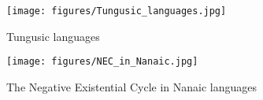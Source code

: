 \documentclass[output=paper]{langscibook}
\begin{document}
\begin{figure}[!h] 
    \captionsetup{name=Map}
    \texttt{[image: figures/Tungusic\_languages.jpg]}
    \caption{Tungusic languages}
    \label{fig:tungusic_languages}
\end{figure}

\pagebreak
\begin{figure}[!h] 
    \captionsetup{name=Map}
    \texttt{[image: figures/NEC\_in\_Nanaic.jpg]}
    \caption{The Negative Existential Cycle in Nanaic languages}
    \label{fig:NEC_nanaic_languages}
\end{figure}
\newpage
{\sloppy\printbibliography[heading=subbibliography,notkeyword=this]}
\end{document}
